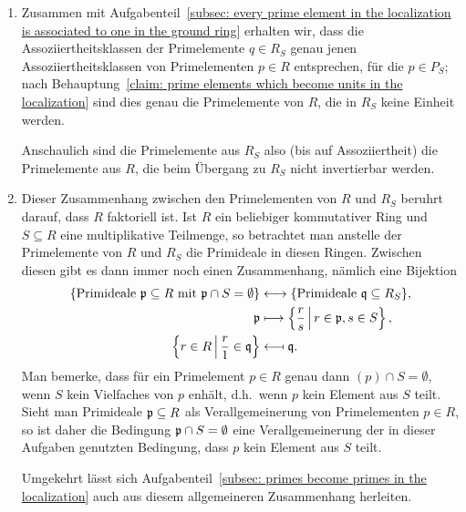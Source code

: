 \documentclass[a4paper,10pt,numbers=noenddot]{scrartcl}
\begin{document}
\begin{remark}
  \begin{enumerate}
    \item
      Zusammen mit Aufgabenteil~\ref{subsec: every prime element in the localization is associated to one in the ground ring} erhalten wir, dass die Assoziiertheitsklassen der Primelemente $q \in R_S$ genau jenen Assoziiertheitsklassen von Prim\-elementen $p \in R$ entsprechen, für die $p \in P_S$; nach Behauptung~\ref{claim: prime elements which become units in the localization} sind dies genau die Primelemente von $R$, die in $R_S$ keine Einheit werden.
      
      Anschaulich sind die Primelemente aus $R_S$ also (bis auf Assoziiertheit) die Primelemente aus $R$, die beim Übergang zu $R_S$ nicht invertierbar werden.
    \item
      Dieser Zusammenhang zwischen den Primelementen von $R$ und $R_S$ beruhrt darauf, dass $R$ faktoriell ist.
      Ist $R$ ein beliebiger kommutativer Ring und $S \subseteq R$ eine multiplikative Teilmenge, so betrachtet man anstelle der Primelemente von $R$ und $R_S$ die Primideale in diesen Ringen.
      Zwischen diesen gibt es dann immer noch einen Zusammenhang,
      nämlich eine Bijektion
      \begin{align*}
                              \{\text{Primideale $\mathfrak{p} \subseteq R$ mit $\mathfrak{p} \cap S = \emptyset$}\}
        &\longleftrightarrow  \{\text{Primideale $\mathfrak{q} \subseteq R_S$}\},
         \\
                              \mathfrak{p}
        &\longmapsto          \left\{ \frac{r}{s} \,\middle|\, r \in \mathfrak{p}, s \in S \right\},
        \\
                              \left\{ r \in R \,\middle|\, \frac{r}{1} \in \mathfrak{q} \right\}
        &\longmapsfrom        \mathfrak{q}.
      \end{align*}
      Man bemerke, dass für ein Primelement $p \in R$ genau dann $(p) \cap S = \emptyset$, wenn $S$ kein Vielfaches von $p$ enhält, d.h.\ wenn $p$ kein Element aus $S$ teilt.
      Sieht man Primideale $\mathfrak{p} \subseteq R$ als Verallgemeinerung von Primelementen $p \in R$, so ist daher die Bedingung $\mathfrak{p} \cap S = \emptyset$ eine Verallgemeinerung der in dieser Aufgaben genutzten Bedingung, dass $p$ kein Element aus $S$ teilt.
      
      Umgekehrt lässt sich Aufgabenteil~\ref{subsec: primes become primes in the localization} auch aus diesem allgemeineren Zusammenhang herleiten.
  \end{enumerate}
\end{remark}
\end{document}
